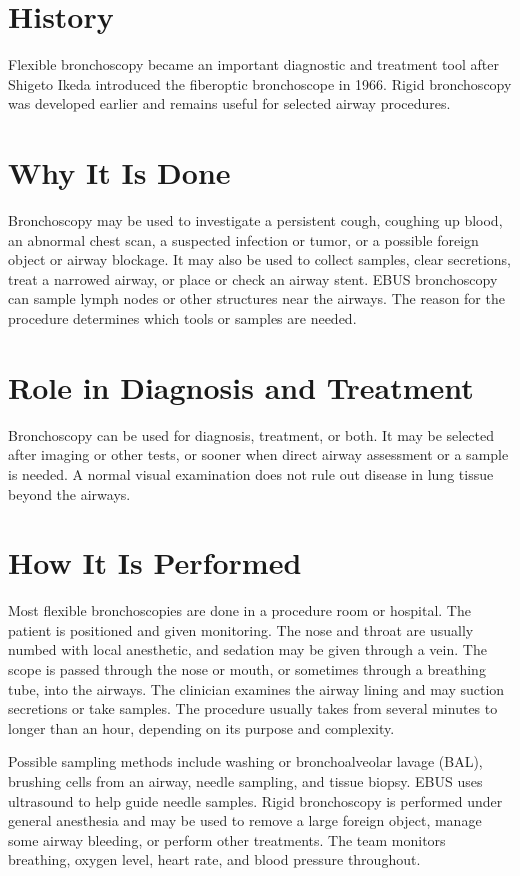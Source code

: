 \section*{History}
Flexible bronchoscopy became an important diagnostic and treatment tool after Shigeto Ikeda introduced the fiberoptic bronchoscope in 1966. Rigid bronchoscopy was developed earlier and remains useful for selected airway procedures.

\section*{Why It Is Done}
Bronchoscopy may be used to investigate a persistent cough, coughing up blood, an abnormal chest scan, a suspected infection or tumor, or a possible foreign object or airway blockage. It may also be used to collect samples, clear secretions, treat a narrowed airway, or place or check an airway stent. EBUS bronchoscopy can sample lymph nodes or other structures near the airways. The reason for the procedure determines which tools or samples are needed.

\section*{Role in Diagnosis and Treatment}
Bronchoscopy can be used for diagnosis, treatment, or both. It may be selected after imaging or other tests, or sooner when direct airway assessment or a sample is needed. A normal visual examination does not rule out disease in lung tissue beyond the airways.

\section*{How It Is Performed}
Most flexible bronchoscopies are done in a procedure room or hospital. The patient is positioned and given monitoring. The nose and throat are usually numbed with local anesthetic, and sedation may be given through a vein. The scope is passed through the nose or mouth, or sometimes through a breathing tube, into the airways. The clinician examines the airway lining and may suction secretions or take samples. The procedure usually takes from several minutes to longer than an hour, depending on its purpose and complexity.

Possible sampling methods include washing or bronchoalveolar lavage (BAL), brushing cells from an airway, needle sampling, and tissue biopsy. EBUS uses ultrasound to help guide needle samples. Rigid bronchoscopy is performed under general anesthesia and may be used to remove a large foreign object, manage some airway bleeding, or perform other treatments. The team monitors breathing, oxygen level, heart rate, and blood pressure throughout.


